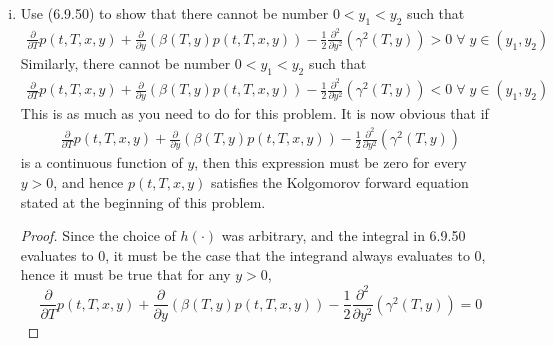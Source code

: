 \documentclass{article}
\newcommand{\fa}{\; \forall \;}
\theoremstyle{definition}
\theoremstyle{definition}
\begin{document}
\begin{enumerate}
\begin{enumerate}[(i)]
\begin{proof}
\begin{align*}
    \end{align*}
    The second step merely used the fundamental theorem of calculus, while the third step added the additive inverse of the RHS to both sides of the equation.
    \end{proof}
    \item Use (6.9.50) to show that there cannot be number $0 <y_1 < y_2$ such that 
    \begin{align*}
        \frac{\partial }{\partial T} p(t,T,x,y) + \frac{\partial }{\partial y} \left( \beta(T,y) p(t,T,x,y) \right) - \frac{1}{2}\frac{\partial^2}{\partial y^2} \left( \gamma^2(T,y) \right)>0 \fa y \in (y_1,y_2)
    \end{align*}
    Similarly, there cannot be number $0< y_1<y_2$ such that
        \begin{align*}
        \frac{\partial }{\partial T} p(t,T,x,y) + \frac{\partial }{\partial y} \left( \beta(T,y) p(t,T,x,y) \right) - \frac{1}{2}\frac{\partial^2}{\partial y^2} \left( \gamma^2(T,y) \right)<0 \fa y \in (y_1,y_2)
    \end{align*}
    This is as much as you need to do for this problem. It is now obvious that if 
    \begin{align*}
        \frac{\partial }{\partial T} p(t,T,x,y) + \frac{\partial }{\partial y} \left( \beta(T,y) p(t,T,x,y) \right) - \frac{1}{2}\frac{\partial^2}{\partial y^2} \left( \gamma^2(T,y) \right)
    \end{align*}
    is a continuous function of $y$, then this expression must be zero for every $y>0$, and hence $p(t,T,x,y)$ satisfies the Kolgomorov forward equation stated at the beginning of this problem.
    
    \begin{proof}
        Since the choice of $h(\cdot)$ was arbitrary, and the integral in 6.9.50 evaluates to $0$, it must be the case that the integrand always evaluates to $0$, hence it must be true that for any $y>0$,  $$\frac{\partial }{\partial T} p(t,T,x,y) + \frac{\partial }{\partial y} \left( \beta(T,y) p(t,T,x,y) \right) - \frac{1}{2}\frac{\partial^2}{\partial y^2} \left( \gamma^2(T,y) \right) = 0$$
    \end{proof}
    
\end{enumerate}
\end{enumerate}
\end{document}
